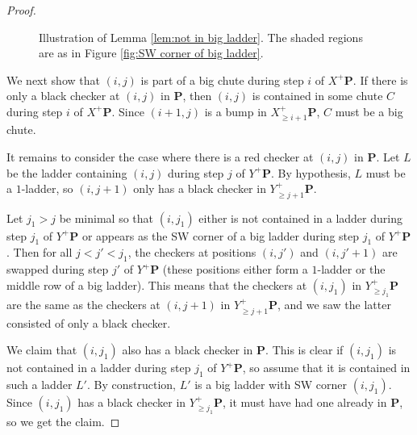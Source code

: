 \documentclass[11pt,reqno]{amsart} %
\makeatletter
\newcommand{\bfP}{\mathbf{P}}
\newenvironment{shift}[1][(0,0)]{
    \begin{scope}[shift={#1}]
}{
    \end{scope}
}
\theoremstyle{definition}
\newcommand{\drawSquare}[3][black,opacity=0.5]{
    \draw[#1,thin]
    (#2-0.5,#3+0.5) rectangle (#2+0.5,#3-0.5);
}
\newcommand{\drawGraySquare}[3][gray,opacity=0.3]{
    \filldraw[#1,thin]
    (#2-0.5,#3+0.5) rectangle (#2+0.5,#3-0.5);
}
\newcommand{\checkerradius}{0.38}
\newcommand{\drawXChecker}[2]{
    \fill[color=x color 2] (#1,#2) circle (\checkerradius);
    \fill[
        color=x color 1,
        pattern color=x color 1,
        pattern={Lines[distance=2pt]},
        thick
    ] (#1,#2) circle (\checkerradius);
    \draw[color=x color 1,thick] (#1,#2) circle (\checkerradius);
}
\newcommand{\drawYChecker}[2]{
    \fill[color=y color 2] (#1,#2) circle (\checkerradius);
    \fill[
        color=y color 1,
        pattern color=y color 1,
        pattern={Lines[distance=1.5pt,angle=90]},
    ] (#1,#2) circle (\checkerradius);
    \draw[color=y color 1, thick] (#1,#2) circle (\checkerradius);
}
\newcommand{\drawXYChecker}[2]{
    \drawXChecker{#1}{#2}
    \drawYChecker{#1-0.1}{#2+0.1}
}
\newcommand{\drawRCGraphTile}[3]{

    \ifnum #3=0 \fi %
    \ifnum #3=1 \drawXChecker{#1}{#2} \fi
    \ifnum #3=2 \drawYChecker{#1}{#2} \fi
    \ifnum #3=3 \drawXYChecker{#1}{#2} \fi
    \ifnum #3=4 \drawGraySquare{#1}{#2}\drawXChecker{#1}{#2} \fi
    \ifnum #3=5 \drawGraySquare{#1}{#2}\drawYChecker{#1}{#2} \fi
    \ifnum #3=6 \fi
    \ifnum #3=7 \fi
    \ifnum #3=8 \fi
    \ifnum #3=9 \drawGraySquare{#1}{#2} \fi
}
\newcommand{\drawRCGraph}[3]{
    \PD@i = 1
    \PD@j = 1
    \foreach \t in {#3}{
        \drawRCGraphTile{\number\PD@j}{-\number\PD@i}{\t}
        \drawSquare{\number\PD@j}{-\number\PD@i}
        
        \ifnum\PD@j < \numexpr#2\relax
            \global\advance\PD@j by 1
        \else
            \global\PD@j = 1
            \global\advance\PD@i by 1
        \fi
    }
}
\newcommand{\drawNorthLabels}[3]{
    \PD@j = 0
    \foreach \j in {#3}{
        \node at (#2+\PD@j,-#1) {\j};
        \global\advance\PD@j by 1
    }
}
\newcommand{\drawWestLabels}[3]{
    \PD@i = 0
    \foreach \i in {#3}{
        \node at (#2,-#1-\PD@i) {\i};
        \global\advance\PD@i by 1
    }
}
\makeatother
\begin{document}
\begin{proof}
\begin{figure}

\caption{
    Illustration of Lemma \ref{lem:not in big ladder}. The shaded regions are as in Figure \ref{fig:SW corner of big ladder}.
}
\label{fig:not in big ladder}
\end{figure}

We next show that $(i,j)$ is part of a big chute during step $i$ of $X^+\bfP$.
If there is only a black checker at $(i,j)$ in $\bfP$, then $(i,j)$ is contained in some chute $C$ during step $i$ of $X^+\bfP$.
Since $(i+1,j)$ is a bump in $X^+_{\geq i+1} \bfP$, $C$ must be a big chute.

It remains to consider the case where there is a red checker at $(i,j)$ in $\bfP$.
Let $L$ be the ladder containing $(i,j)$ during step $j$ of $Y^+\bfP$.
By hypothesis, $L$ must be a $1$-ladder, so $(i,j+1)$ only has a black checker in $Y^+_{\geq j+1}\bfP$.

Let $j_1>j$ be minimal so that $(i,j_1)$ either is not contained in a ladder during step $j_1$ of $Y^+\bfP$ or appears as the SW corner of a big ladder during step $j_1$ of $Y^+\bfP$.
Then for all $j<j'<j_1$, the checkers at positions $(i,j')$ and $(i,j'+1)$ are swapped during step $j'$ of $Y^+\bfP$ (these positions either form a $1$-ladder or the middle row of a big ladder).
This means that the checkers at $(i,j_1)$ in $Y^+_{\geq j_1}\bfP$ are the same as the checkers at $(i,j+1)$ in $Y^+_{\geq j+1}\bfP$, and we saw the latter consisted of only a black checker.

We claim that $(i,j_1)$ also has a black checker in $\bfP$.
This is clear if $(i,j_1)$ is not contained in a ladder during step $j_1$ of $Y^+\bfP$, so assume that it is contained in such a ladder $L'$.
By construction, $L'$ is a big ladder with SW corner $(i,j_1)$.
Since $(i,j_1)$ has a black checker in $Y^+_{\geq j_1}\bfP$, it must have had one already in $\bfP$, so we get the claim.


\end{proof}
\end{document}
